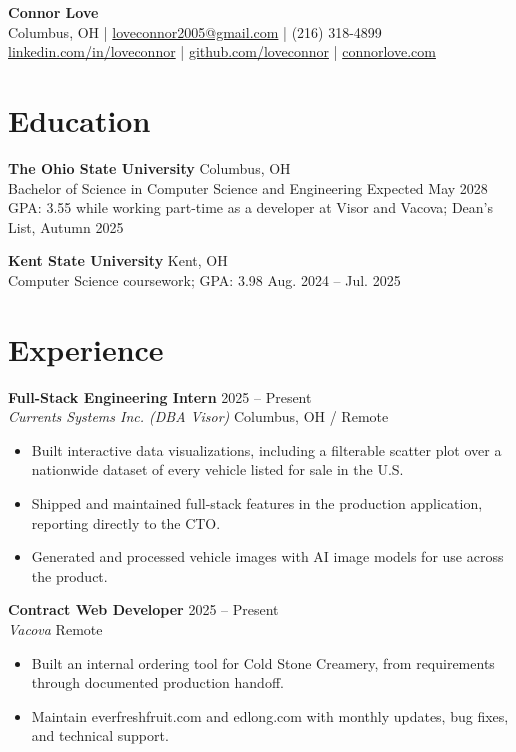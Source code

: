 \documentclass[10pt]{article}
\begin{document}
\begin{center}
  {\LARGE \textbf{Connor Love}}\\[3pt]
  \small
  Columbus, OH \quad | \quad
  \href{mailto:loveconnor2005@gmail.com}{loveconnor2005@gmail.com} \quad | \quad
  (216) 318-4899\\[2pt]
  \href{https://www.linkedin.com/in/loveconnor}{linkedin.com/in/loveconnor} \quad | \quad
  \href{https://github.com/loveconnor}{github.com/loveconnor} \quad | \quad
  \href{https://www.connorlove.com}{connorlove.com}
\end{center}

\section*{Education}
\textbf{The Ohio State University} \hfill Columbus, OH\\
Bachelor of Science in Computer Science and Engineering \hfill Expected May 2028\\
GPA: 3.55 while working part-time as a developer at Visor and Vacova; Dean's List, Autumn 2025

\vspace{3pt}
\textbf{Kent State University} \hfill Kent, OH\\
Computer Science coursework; GPA: 3.98 \hfill Aug. 2024 -- Jul. 2025

\section*{Experience}
\textbf{Full-Stack Engineering Intern} \hfill 2025 -- Present\\
\textit{Currents Systems Inc. (DBA Visor)} \hfill Columbus, OH / Remote
\begin{itemize}
  \item Built interactive data visualizations, including a filterable scatter plot over a nationwide dataset of every vehicle listed for sale in the U.S.
  \item Shipped and maintained full-stack features in the production application, reporting directly to the CTO.
  \item Generated and processed vehicle images with AI image models for use across the product.
\end{itemize}

\textbf{Contract Web Developer} \hfill 2025 -- Present\\
\textit{Vacova} \hfill Remote
\begin{itemize}
  \item Built an internal ordering tool for Cold Stone Creamery, from requirements through documented production handoff.
  \item Maintain everfreshfruit.com and edlong.com with monthly updates, bug fixes, and technical support.
\end{itemize}
\end{document}
